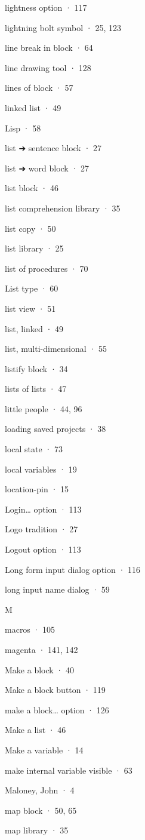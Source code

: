 \documentclass[
  letterpaper,
]{book}
\begin{document}
lightness option · 117

lightning bolt symbol · 25, 123

line break in block · 64

line drawing tool · 128

lines of block · 57

linked list · 49

Lisp · 58

list ➔ sentence block · 27

list ➔ word block · 27

list block · 46

list comprehension library · 35

list copy · 50

list library · 25

list of procedures · 70

List type · 60

list view · 51

list, linked · 49

list, multi-dimensional · 55

listify block · 34

lists of lists · 47

little people · 44, 96

loading saved projects · 38

local state · 73

local variables · 19

location-pin · 15

Login\ldots{} option · 113

Logo tradition · 27

Logout option · 113

Long form input dialog option · 116

long input name dialog · 59

M

macros · 105

magenta · 141, 142

Make a block · 40

Make a block button · 119

make a block\ldots{} option · 126

Make a list · 46

Make a variable · 14

make internal variable visible · 63

Maloney, John · 4

map block · 50, 65

map library · 35
\end{document}
